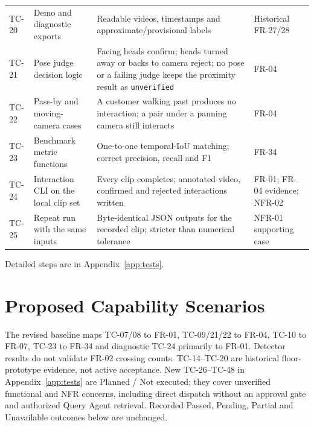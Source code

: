 \begin{longtable}{P{0.09\textwidth}P{0.3\textwidth}P{0.32\textwidth}P{0.14\textwidth}}
TC-20 & Demo and diagnostic exports & Readable videos, timestamps and approximate/provisional labels & Historical FR-27/28\\
TC-21 & Pose judge decision logic & Facing heads confirm; heads turned away or backs to camera reject; no pose or a failing judge keeps the proximity result as \texttt{unverified} & FR-04\\
TC-22 & Pass-by and moving-camera cases & A customer walking past produces no interaction; a pair under a panning camera still interacts & FR-04\\
TC-23 & Benchmark metric functions & One-to-one temporal-IoU matching; correct precision, recall and F1 & FR-34\\
TC-24 & Interaction CLI on the local clip set & Every clip completes; annotated video, confirmed and rejected interactions written & FR-01; FR-04 evidence; NFR-02\\
TC-25 & Repeat run with the same inputs & Byte-identical JSON outputs for the recorded clip; stricter than numerical tolerance & NFR-01 supporting case\\
\bottomrule
\end{longtable}
Detailed steps are in Appendix~\ref{app:tests}.

\section{Proposed Capability Scenarios}
The revised baseline maps TC-07/08 to FR-01, TC-09/21/22 to FR-04, TC-10 to FR-07, TC-23 to FR-34 and diagnostic TC-24 primarily to FR-01. Detector results do not validate FR-02 crossing counts. TC-14--TC-20 are historical floor-prototype evidence, not active acceptance. New TC-26--TC-48 in Appendix~\ref{app:tests} are Planned / Not executed; they cover unverified functional and NFR concerns, including direct dispatch without an approval gate and authorized Query Agent retrieval. Recorded Passed, Pending, Partial and Unavailable outcomes below are unchanged.

